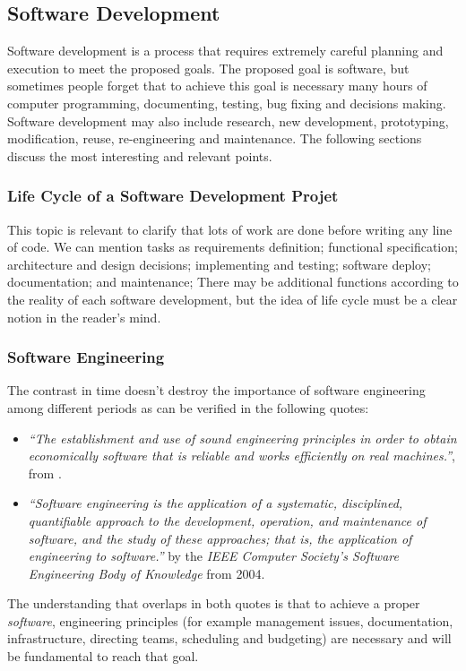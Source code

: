 \documentclass[ppgc,mestrado,english]{iiufrgs}
\begin{document}
\subsection{Software Development}
Software development is a process that requires extremely careful planning and execution to meet the proposed goals. The proposed goal is software, but sometimes people forget that to achieve this goal is necessary many hours of computer programming, documenting, testing, bug fixing and decisions making. Software development may also include research, new development, prototyping, modification, reuse, re-engineering and maintenance. The following sections discuss the most interesting and relevant points.
\subsubsection{Life Cycle of a Software Development Projet}
This topic is relevant to clarify that lots of work are done before writing any line of code. We can mention tasks as requirements definition; functional specification; architecture and design decisions; implementing and testing; software deploy; documentation; and maintenance;
There may be additional functions according to the reality of each software development, but the idea of life cycle must be a clear notion in the reader's mind.

\subsubsection{Software Engineering}
The contrast in time doesn't destroy the importance of software engineering among different periods as can be verified in the following quotes:
\begin{itemize}
\item \emph{``The establishment and use of sound engineering principles in order to obtain economically software that is reliable and works efficiently on real machines.''}, from \cite{Bauer:68}. 

\item \emph{``Software engineering is the application of a systematic, disciplined, quantifiable approach to the development, operation, and maintenance of software, and the study of these approaches; that is, the application of engineering to software.''} by the \emph{IEEE Computer Society's Software Engineering Body of Knowledge} from 2004.
\end{itemize}
The understanding that overlaps in both quotes is that to achieve a proper \emph{software}, engineering principles (for example management issues, documentation, infrastructure, directing teams, scheduling and budgeting) are necessary and will be fundamental to reach that goal.
\end{document}
